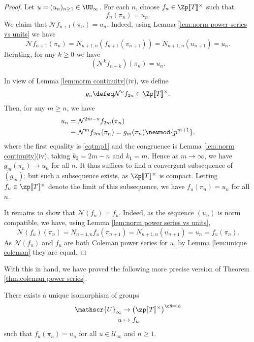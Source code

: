 \documentclass[a4paper,10pt, english, reqno]{smfart}
\newcommand{\lsem}{[\! [}
\newcommand{\rsem}{]\! ]}
\numberwithin{equation}{section}
\begin{document}
\begin{proof}
Let $u  = (u_n)_{n \geq 1} \in \UU_\infty$. For each $n$, choose $f_n \in \Zp\lsem T\rsem^\times$ such that
\[
f_n(\pi_n) = u_n.
\]
We claim that $\mathcal{N} f_{n+1}(\pi_n) = u_n$. Indeed, using Lemma \ref{lem:norm power series vs units} we have
\[ \mathcal{N} f_{n+1}(\pi_n) = N_{n+1, n}(f_{n+1}(\pi_{n+1})) = N_{n+1, n}(u_{n+1}) = u_n.  \]
Iterating, for any $k \geq 0$ we have
\begin{equation} \label{eqtmp1}
(\mathcal{N}^k f_{n+k})(\pi_n) = u_n.
\end{equation}

In view of Lemma \ref{lem:norm continuity}(iv), we define
\[ 
g_n \defeq \mathcal{N}^{n} f_{2n} \in \Zp\lsem T\rsem^\times. 
\] 
Then, for any $m \geq n$, we have
\begin{align*}
u_n &= \mathcal{N}^{2m - n} f_{2m}(\pi_n) \\
&\equiv \mathcal{N}^{m} f_{2m}(\pi_n) = g_m(\pi_n) \newmod{p^{m+1}},
\end{align*}
where the first equality is \eqref{eqtmp1} and the congruence is Lemma \ref{lem:norm continuity}(iv), taking $k_2 = 2m - n$ and $k_1 = m$. Hence as $m \to \infty$, we have $g_m(\pi_n) \to u_n$ for all $n$. It thus suffices to find a convergent subsequence of $(g_m)$; but such a subsequence exists, as $\Zp\lsem T\rsem^\times$ is compact. Letting $f_u \in \zp\lsem T\rsem^\times$ denote the limit of this subsequence, we have $f_u(\pi_n) = u_n$ for all $n$.

It remains to show that $\mathcal{N}(f_u) = f_u$. Indeed, as the sequence $(u_n)$ is norm compatible, we have, using Lemma \ref{lem:norm power series vs units}, 
\[
    \mathcal{N}(f_u)(\pi_{n}) = N_{n+1, n}f_u(\pi_{n+1}) = N_{n+1, n}(u_{n+1}) = u_n = f_u(\pi_n).
\]
As $\mathcal{N}(f_u)$ and $f_u$ are both Coleman power series for $u$, by Lemma \ref{lem:unique coleman} they are equal.
\end{proof}


With this in hand, we have proved the following  more precise version of Theorem \ref{thm:coleman power series}.

\begin{theorem} \label{thm:coleman map 2}
	There exists a unique isomorphism of groups
	\begin{align*}
		\mathscr{U}_\infty &\to \big(\zp\lsem T\rsem^\times\big)^{\cN=\mathrm{id}}  \\
		u &\mapsto f_u
	\end{align*}
	such that $f_u(\pi_n) = u_n$ for all $u \in \mathscr{U}_\infty$ and $n\geq 1$.
\end{theorem}
\end{document}
